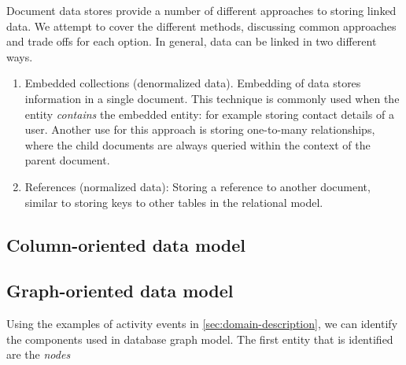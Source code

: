 





Document data stores provide a number of different approaches to storing linked data.
We attempt to cover the different methods, discussing common approaches and trade offs for each option.
In general, data can be linked in two different ways.

\begin{enumerate}
  \item Embedded collections (denormalized data).
        Embedding of data stores information in a single document.
        This technique is commonly used when the entity \textit{contains} the embedded entity: for example storing contact details of a user.
        Another use for this approach is storing one-to-many relationships, where the child documents are always queried within the context of the parent document.
  \item References (normalized data): Storing a reference to another document, similar to storing keys to other tables in the relational model.

\end{enumerate}

\subsection{Column-oriented data model}
\label{subsec:column-data-model}

\subsection{Graph-oriented data model}
\label{subsec:graph-data-model}

Using the examples of activity events in \cref{sec:domain-description}, we can identify the components used in database graph model.
The first entity that is identified are the \textit{nodes}

